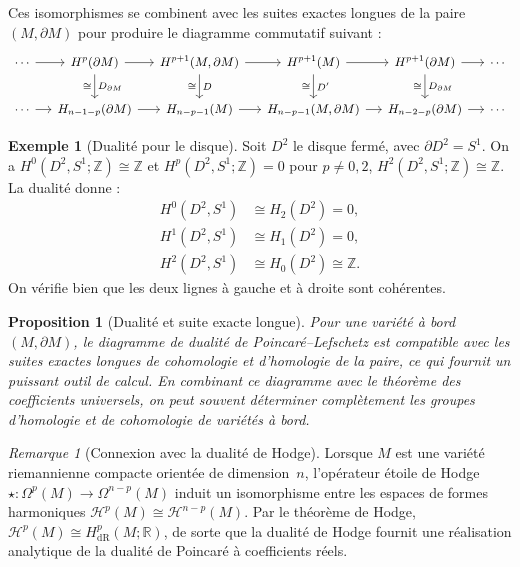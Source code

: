 \documentclass[12pt,a4paper,openany]{book}
\theoremstyle{definition}
\newtheorem{exemple}[definition]{Exemple}
\theoremstyle{plain}
\newtheorem{proposition}[definition]{Proposition}
\theoremstyle{remark}
\newtheorem{remarque}[definition]{Remarque}
\newcommand{\Z}{\mathbb{Z}}
\newcommand{\R}{\mathbb{R}}
\begin{document}
Ces isomorphismes se combinent avec les suites exactes longues de la paire
$(M, \partial M)$ pour produire le diagramme commutatif suivant :
\[
  \begin{tikzcd}[column sep=small, font=\small]
    \cdots \ar[r] & H^p(\partial M) \ar[r] \ar[d, "\cong"', "D_{\partial M}"]
    & H^{p+1}(M, \partial M) \ar[r] \ar[d, "\cong"', "D"]
    & H^{p+1}(M) \ar[r] \ar[d, "\cong"', "D'"]
    & H^{p+1}(\partial M) \ar[r] \ar[d, "\cong"', "D_{\partial M}"]
    & \cdots \\
    \cdots \ar[r] & H_{n-1-p}(\partial M) \ar[r]
    & H_{n-p-1}(M) \ar[r]
    & H_{n-p-1}(M, \partial M) \ar[r]
    & H_{n-2-p}(\partial M) \ar[r]
    & \cdots
  \end{tikzcd}
\]

\begin{exemple}[Dualité pour le disque]\label{ex:dualite-disque}
  Soit $D^2$ le disque fermé, avec $\partial D^2 = S^1$. On a
  $H^0(D^2, S^1; \Z) \cong \Z$ et $H^p(D^2, S^1; \Z) = 0$ pour $p \neq 0, 2$,
  $H^2(D^2, S^1; \Z) \cong \Z$. La dualité donne :
  \begin{align*}
    H^0(D^2, S^1) &\cong H_2(D^2) = 0, \\
    H^1(D^2, S^1) &\cong H_1(D^2) = 0, \\
    H^2(D^2, S^1) &\cong H_0(D^2) \cong \Z.
  \end{align*}
  On vérifie bien que les deux lignes à gauche et à droite sont cohérentes.
\end{exemple}

\begin{proposition}[Dualité et suite exacte longue]\label{prop:dualite-sel}
  Pour une variété à bord $(M, \partial M)$, le diagramme de dualité de
  Poincaré--Lefschetz est compatible avec les suites exactes longues de cohomologie
  et d'homologie de la paire, ce qui fournit un puissant outil de calcul. En
  combinant ce diagramme avec le théorème des coefficients universels, on peut
  souvent déterminer complètement les groupes d'homologie et de cohomologie de
  variétés à bord.
\end{proposition}

\begin{remarque}[Connexion avec la dualité de Hodge]\label{rem:hodge}
  Lorsque $M$ est une variété riemannienne compacte orientée de dimension~$n$,
  l'opérateur étoile de Hodge $\star \colon \Omega^p(M) \to \Omega^{n-p}(M)$
  induit un isomorphisme entre les espaces de formes harmoniques
  $\mathcal{H}^p(M) \cong \mathcal{H}^{n-p}(M)$. Par le théorème de Hodge,
  $\mathcal{H}^p(M) \cong H^p_{\mathrm{dR}}(M; \R)$, de sorte que la dualité de
  Hodge fournit une réalisation analytique de la dualité de Poincaré à coefficients
  réels.
\end{remarque}
\end{document}
